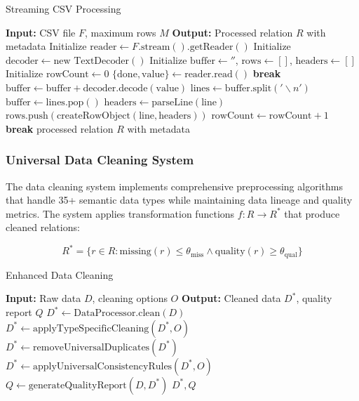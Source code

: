 \documentclass[acmsmall]{acmart}
\begin{document}
\begin{algorithm}[h]
\caption{Streaming CSV Processing}
\label{alg:csv_processing}
\begin{algorithmic}[1]
\STATE \textbf{Input:} CSV file $F$, maximum rows $M$
\STATE \textbf{Output:} Processed relation $R$ with metadata
\STATE Initialize $\text{reader} \leftarrow F.\text{stream}().\text{getReader}()$
\STATE Initialize $\text{decoder} \leftarrow \text{new TextDecoder}()$
\STATE Initialize $\text{buffer} \leftarrow ''$, $\text{rows} \leftarrow []$, $\text{headers} \leftarrow []$
\STATE Initialize $\text{rowCount} \leftarrow 0$
    \STATE $\{\text{done}, \text{value}\} \leftarrow \text{reader.read}()$
        \STATE \textbf{break}
    \ENDIF
    \STATE $\text{buffer} \leftarrow \text{buffer} + \text{decoder.decode}(\text{value})$
    \STATE $\text{lines} \leftarrow \text{buffer.split}('\backslash n')$
    \STATE $\text{buffer} \leftarrow \text{lines.pop}()$
            \STATE $\text{headers} \leftarrow \text{parseLine}(\text{line})$
        \ELSE
            \STATE $\text{rows.push}(\text{createRowObject}(\text{line}, \text{headers}))$
        \ENDIF
        \STATE $\text{rowCount} \leftarrow \text{rowCount} + 1$
            \STATE \textbf{break}
        \ENDIF
    \ENDFOR
\ENDWHILE
\RETURN processed relation $R$ with metadata
\end{algorithmic}
\end{algorithm}

\subsubsection{Universal Data Cleaning System}

The data cleaning system implements comprehensive preprocessing algorithms that handle 35+ semantic data types while maintaining data lineage and quality metrics. The system applies transformation functions $f: R \rightarrow R^*$ that produce cleaned relations:

\begin{equation}
R^* = \{r \in R : \text{missing}(r) \leq \theta_{\text{miss}} \land \text{quality}(r) \geq \theta_{\text{qual}}\}
\end{equation}

\begin{algorithm}[h]
\caption{Enhanced Data Cleaning}
\label{alg:data_cleaning}
\begin{algorithmic}[1]
\STATE \textbf{Input:} Raw data $D$, cleaning options $O$
\STATE \textbf{Output:} Cleaned data $D^*$, quality report $Q$
\STATE $D^* \leftarrow \text{DataProcessor.clean}(D)$
    \STATE $D^* \leftarrow \text{applyTypeSpecificCleaning}(D^*, O)$
\ENDIF
{}
    \STATE $D^* \leftarrow \text{removeUniversalDuplicates}(D^*)$
\ENDIF
{}
    \STATE $D^* \leftarrow \text{applyUniversalConsistencyRules}(D^*, O)$
\ENDIF
\STATE $Q \leftarrow \text{generateQualityReport}(D, D^*)$
\RETURN $D^*, Q$
\end{algorithmic}
\end{algorithm}
\end{document}
